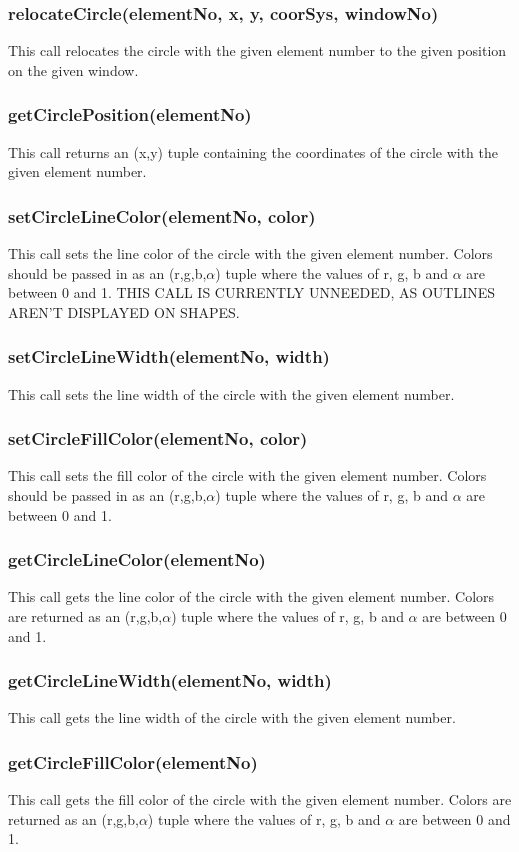 \documentclass{acm_proc_article-sp}
\begin{document}
\subsubsection{relocateCircle(elementNo, x, y, coorSys, windowNo)}
This call relocates the circle with the given element number to the given position on the given window.
\subsubsection{getCirclePosition(elementNo)}
This call returns an (x,y) tuple containing the coordinates of the circle with the given element number.
\subsubsection{setCircleLineColor(elementNo, color)}
This call sets the line color of the circle with the given element number. Colors should be passed in as an (r,g,b,$\alpha$) tuple where the values of r, g, b and $\alpha$ are between 0 and 1. THIS CALL IS CURRENTLY UNNEEDED, AS OUTLINES AREN'T DISPLAYED ON SHAPES.
\subsubsection{setCircleLineWidth(elementNo, width)}
This call sets the line width of the circle with the given element number.
\subsubsection{setCircleFillColor(elementNo, color)}
This call sets the fill color of the circle with the given element number. Colors should be passed in as an (r,g,b,$\alpha$) tuple where the values of r, g, b and $\alpha$ are between 0 and 1.
\subsubsection{getCircleLineColor(elementNo)}
This call gets the line color of the circle with the given element number. Colors are returned as an (r,g,b,$\alpha$) tuple where the values of r, g, b and $\alpha$ are between 0 and 1.
\subsubsection{getCircleLineWidth(elementNo, width)}
This call gets the line width of the circle with the given element number.
\subsubsection{getCircleFillColor(elementNo)}
This call gets the fill color of the circle with the given element number. Colors are returned as an (r,g,b,$\alpha$) tuple where the values of r, g, b and $\alpha$ are between 0 and 1.
\end{document}
